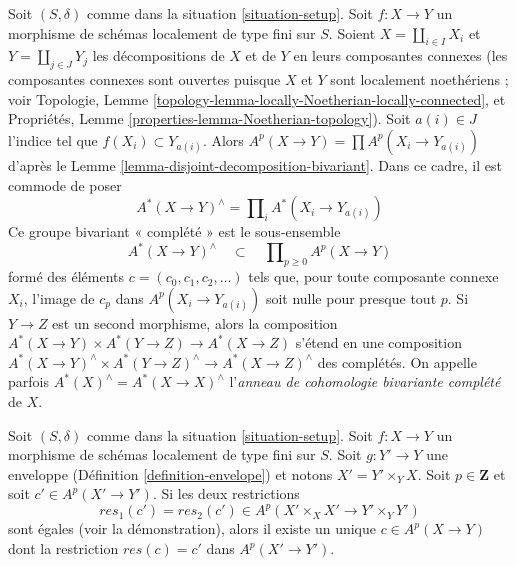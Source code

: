 \begin{remark}
\label{remark-completion-bivariant}
Soit $(S, \delta)$ comme dans la situation \ref{situation-setup}.
Soit $f : X \to Y$ un morphisme de schémas localement de type fini sur $S$.
Soient $X = \coprod_{i \in I} X_i$ et $Y = \coprod_{j \in J} Y_j$
les décompositions de $X$ et de $Y$ en leurs composantes connexes
(les composantes connexes sont ouvertes puisque $X$ et $Y$ sont localement noethériens ; voir
Topologie, Lemme \ref{topology-lemma-locally-Noetherian-locally-connected}, et
Propriétés, Lemme \ref{properties-lemma-Noetherian-topology}).
Soit $a(i) \in J$ l'indice tel que $f(X_i) \subset Y_{a(i)}$.
Alors $A^p(X \to Y) = \prod A^p(X_i \to Y_{a(i)})$ d'après le
Lemme \ref{lemma-disjoint-decomposition-bivariant}.
Dans ce cadre, il est commode de poser
$$
A^*(X \to Y)^\wedge = \prod\nolimits_i A^*(X_i \to Y_{a(i)})
$$
Ce groupe bivariant « complété » est le sous-ensemble
$$
A^*(X \to Y)^\wedge \quad\subset\quad \prod\nolimits_{p \geq 0} A^p(X \to Y)
$$
formé des éléments $c = (c_0, c_1, c_2, \ldots)$ tels que,
pour toute composante connexe $X_i$, l'image de $c_p$ dans
$A^p(X_i \to Y_{a(i)})$ soit nulle pour presque tout $p$.
Si $Y \to Z$ est un second morphisme, alors la
composition $A^*(X \to Y) \times A^*(Y \to Z) \to A^*(X \to Z)$
s'étend en une composition
$A^*(X \to Y)^\wedge \times A^*(Y \to Z)^\wedge \to A^*(X \to Z)^\wedge$
des complétés.
On appelle parfois $A^*(X)^\wedge = A^*(X \to X)^\wedge$
l'{\it anneau de cohomologie bivariante complété} de $X$.
\end{remark}

\begin{lemma}
\label{lemma-envelope-bivariant}
Soit $(S, \delta)$ comme dans la situation \ref{situation-setup}.
Soit $f : X \to Y$ un morphisme de schémas localement de type fini sur $S$.
Soit $g : Y' \to Y$ une enveloppe (Définition \ref{definition-envelope})
et notons $X' = Y' \times_Y X$. Soit $p \in \mathbf{Z}$ et soit
$c' \in A^p(X' \to Y')$. Si les deux restrictions
$$
res_1(c') = res_2(c') \in A^p(X' \times_X X' \to Y' \times_Y Y')
$$
sont égales (voir la démonstration), alors il existe un unique $c \in A^p(X \to Y)$
dont la restriction $res(c) = c'$ dans $A^p(X' \to Y')$.
\end{lemma}

